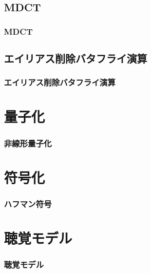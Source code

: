 \documentclass[17pt,xcolor=dvipsnames,table,dvipdfmx]{beamer}
\begin{document}
\subsection{MDCT}

\begin{frame}[c]
    \frametitle{MDCT}
\end{frame}

\subsection{エイリアス削除バタフライ演算}

\begin{frame}[c]
    \frametitle{エイリアス削除バタフライ演算}
\end{frame}

\section{量子化}

\begin{frame}[c]
    \frametitle{非線形量子化}
\end{frame}

\section{符号化}

\begin{frame}[c]
    \frametitle{ハフマン符号}
\end{frame}

\section{聴覚モデル}

\begin{frame}[c]
    \frametitle{聴覚モデル}
\end{frame}
\end{document}
